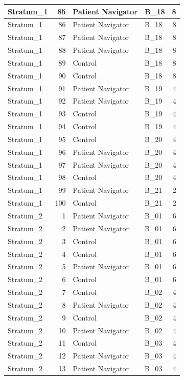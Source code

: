 \documentclass[
]{book}
\begin{document}
\begin{table}[H]
\begin{tabular}{l|r|l|l|r}
\hline
Stratum\_1 & 85 & Patient Navigator & B\_18 & 8\\
\hline
Stratum\_1 & 86 & Patient Navigator & B\_18 & 8\\
\hline
Stratum\_1 & 87 & Patient Navigator & B\_18 & 8\\
\hline
Stratum\_1 & 88 & Patient Navigator & B\_18 & 8\\
\hline
Stratum\_1 & 89 & Control & B\_18 & 8\\
\hline
Stratum\_1 & 90 & Control & B\_18 & 8\\
\hline
Stratum\_1 & 91 & Patient Navigator & B\_19 & 4\\
\hline
Stratum\_1 & 92 & Patient Navigator & B\_19 & 4\\
\hline
Stratum\_1 & 93 & Control & B\_19 & 4\\
\hline
Stratum\_1 & 94 & Control & B\_19 & 4\\
\hline
Stratum\_1 & 95 & Control & B\_20 & 4\\
\hline
Stratum\_1 & 96 & Patient Navigator & B\_20 & 4\\
\hline
Stratum\_1 & 97 & Patient Navigator & B\_20 & 4\\
\hline
Stratum\_1 & 98 & Control & B\_20 & 4\\
\hline
Stratum\_1 & 99 & Patient Navigator & B\_21 & 2\\
\hline
Stratum\_1 & 100 & Control & B\_21 & 2\\
\hline
Stratum\_2 & 1 & Patient Navigator & B\_01 & 6\\
\hline
Stratum\_2 & 2 & Patient Navigator & B\_01 & 6\\
\hline
Stratum\_2 & 3 & Control & B\_01 & 6\\
\hline
Stratum\_2 & 4 & Control & B\_01 & 6\\
\hline
Stratum\_2 & 5 & Patient Navigator & B\_01 & 6\\
\hline
Stratum\_2 & 6 & Control & B\_01 & 6\\
\hline
Stratum\_2 & 7 & Control & B\_02 & 4\\
\hline
Stratum\_2 & 8 & Patient Navigator & B\_02 & 4\\
\hline
Stratum\_2 & 9 & Control & B\_02 & 4\\
\hline
Stratum\_2 & 10 & Patient Navigator & B\_02 & 4\\
\hline
Stratum\_2 & 11 & Control & B\_03 & 4\\
\hline
Stratum\_2 & 12 & Patient Navigator & B\_03 & 4\\
\hline
Stratum\_2 & 13 & Patient Navigator & B\_03 & 4\\

\end{tabular}
\end{table}
\end{document}

